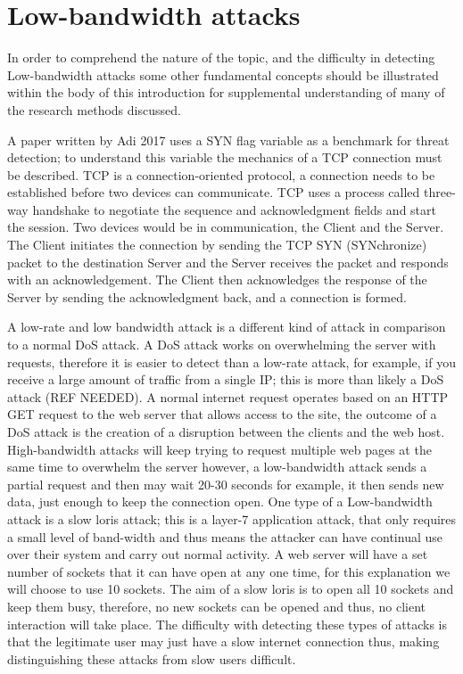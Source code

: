 
\section{Low-bandwidth attacks} \label{attack1}

In order to comprehend the nature of the topic, and the difficulty in detecting Low-bandwidth attacks some other fundamental concepts should be illustrated within the body of this introduction for supplemental understanding of many of the research methods discussed.

A paper written by Adi 2017 uses a SYN flag variable as a benchmark for threat detection; to understand this variable the mechanics of a TCP connection must be described. TCP is a connection-oriented protocol, a connection needs to be established before two devices can communicate. TCP uses a process called three-way handshake to negotiate the sequence and acknowledgment fields and start the session. Two devices would be in communication, the Client and the Server. The Client initiates the connection by sending the TCP SYN (SYNchronize) packet to the destination Server and the Server receives the packet and responds with an acknowledgement. The Client then acknowledges the response of the Server by sending the acknowledgment back, and a connection is formed. 

A low-rate and low bandwidth attack is a different kind of attack in comparison to a normal DoS attack. A DoS attack works on overwhelming the server with requests, therefore it is easier to detect than a low-rate attack, for example, if you receive a large amount of traffic from a single IP; this is more than likely a DoS attack (REF NEEDED). A normal internet request operates based on an HTTP GET request to the web server that allows access to the site, the outcome of a DoS attack is the creation of a disruption between the clients and the web host. High-bandwidth attacks will keep trying to request multiple web pages at the same time to overwhelm the server however, a low-bandwidth attack sends a partial request and then may wait 20-30 seconds for example, it then sends new data, just enough to keep the connection open. One type of a Low-bandwidth attack is a slow loris attack; this is a layer-7 application attack, that only requires a small level of band-width and thus means the attacker can have continual use over their system and carry out normal activity. A web server will have a set number of sockets that it can have open at any one time, for this explanation we will choose to use 10 sockets. The aim of a slow loris is to open all 10 sockets and keep them busy, therefore, no new sockets can be opened and thus, no client interaction will take place. The difficulty with detecting these types of attacks is that the legitimate user may just have a slow internet connection thus, making distinguishing these attacks from slow users difficult. 
